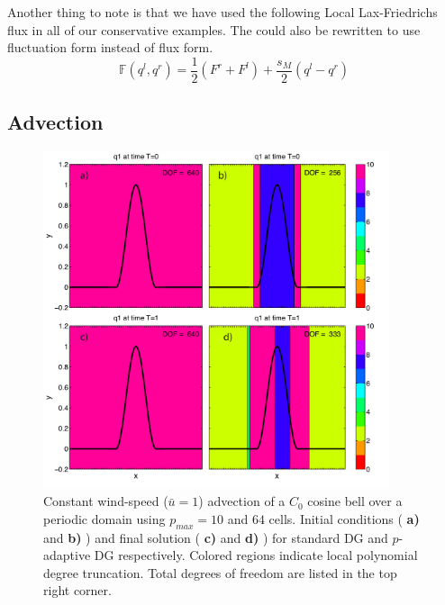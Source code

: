 \documentclass[10]{amsart}
\begin{document}
Another thing to note is that we have used the following Local Lax-Friedrichs flux in all of our conservative examples.
The could also be rewritten to use fluctuation form instead of flux form.
$$\mathbb{F}(q^l,q^r)=\frac{1}{2}\left(F^r+F^l\right) + \frac{s_M}{2}\left(q^l-q^r\right)$$
\subsection{Advection}

\begin{figure}
\hfil\includegraphics[width=4.0in]{figures/cosbellCmpre_E64N10.pdf}\hfil
\caption{Constant wind-speed ($\bar u = 1$) advection of a $C_0$ cosine bell over a periodic domain using $p_{max} = 10$ and $64$ cells. Initial conditions ( {\bf a)} and {\bf b)} ) and final solution ( {\bf c)} and {\bf d)} ) for standard DG and $p$-adaptive DG respectively. Colored regions indicate local polynomial degree truncation. Total degrees of freedom are listed in the top right corner. } \label{cosbellCmpre}
\end{figure}
\end{document}
